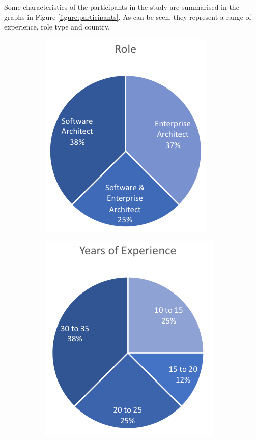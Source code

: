 Some characteristics of the participants in the study are summarised in the graphs in Figure \ref{figure:participants}.  As can be seen, they represent a range of experience, role type and country.


\begin{figure}
   \begin{subfigure}{.5\linewidth}
      \centering
      \includegraphics[scale=1.0]{Figures/prioritisation-roles}
   \end{subfigure}
   \begin{subfigure}{.5\linewidth}
      \centering
      \includegraphics[scale=1.0]{Figures/prioritisation-yearsexp}

\end{subfigure}
\end{figure}
